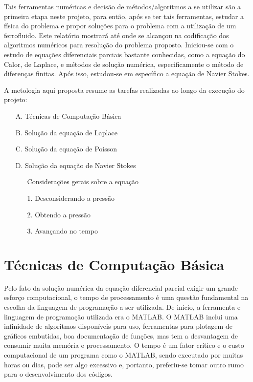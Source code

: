 \documentclass[journal]{IEEEtran}
\begin{document}
Tais ferramentas numéricas e decisão de métodos/algoritmos a se utilizar são a primeira etapa neste projeto, para então, após se ter tais ferramentas, estudar a física do problema e propor soluções para o problema com a utilização de um ferrofluido. Este relatório mostrará até onde se alcançou na codificação dos algoritmos numéricos para resolução do problema proposto. Iniciou-se com o estudo de equações diferenciais parciais bastante conhecidas, como a equação do Calor, de Laplace, e métodos de solução numérica, especificamente o método de diferenças finitas. Após isso, estudou-se em específico a equação de Navier Stokes\cite{notas_de_aula_john}.

A metologia aqui proposta resume as tarefas realizadas ao longo da execução do projeto:
\begin{enumerate}
  \item[A.] Técnicas de Computação Básica
  \item[B.] Solução da equação de Laplace
  \item[C.] Solução da equação de Poisson
  \item[D.] Solução da equação de Navier Stokes
  \begin{enumerate}
  \item [] Considerações gerais sobre a equação
  \item[1.] Desconsiderando a pressão
  \item[2.] Obtendo a pressão
  \item[3.] Avançando no tempo
  \end{enumerate}
\end{enumerate}
\section{Técnicas de Computação Básica}
Pelo fato da solução numérica da equação diferencial parcial exigir um grande esforço computacional, o tempo de processamento é uma questão fundamental na escolha da linguagem de programação a ser utilizada. De início, a ferramenta e linguagem de programação utilizada era o MATLAB\textregistered. O MATLAB inclui uma infinidade de algoritmos disponíveis para uso, ferramentas para plotagem de gráficos embutidas, boa documentação de funções, mas tem a desvantagem de consumir muita memória e processamento. O tempo é um fator crítico e o custo computacional de um programa como o MATLAB, sendo executado por muitas horas ou dias, pode ser algo excessivo e, portanto, preferiu-se tomar outro rumo para o desenvolvimento dos códigos.
\end{document}
